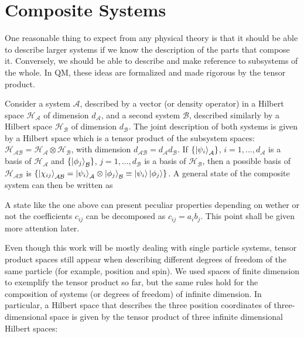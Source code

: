 \documentclass[12pt,a4paper,notitlepage]{report}
\begin{document}
\section{Composite Systems}
\label{sec:composite}

One reasonable thing to expect from any physical theory is that it should be able to describe larger systems if we know the description of the parts that compose it. Conversely, we should be able to describe and make reference to subsystems of the whole. In QM, these ideas are formalized and made rigorous by the tensor product.

Consider a system $\mathcal{A}$, described by a vector (or density operator) in a Hilbert space $\mathcal{H}_{\mathcal{A}}$ of dimension $d_\mathcal{A}$, and a second system $\mathcal{B}$, described similarly by a Hilbert space $\mathcal{H}_{\mathcal{B}}$ of dimension $d_\mathcal{B}$. The joint description of both systems is given by a Hilbert space which is a tensor product of the subsystem spaces: $\mathcal{H}_{\mathcal{AB}} = \mathcal{H}_{\mathcal{A}}\otimes\mathcal{H}_{\mathcal{B}}$, with dimension $d_{\mathcal{AB}} = d_\mathcal{A} d_\mathcal{B}$. If $\{ \ket{\psi_i}_\mathcal{A} \}$, $i = 1, ..., d_\mathcal{A}$ is a basis of $\mathcal{H}_\mathcal{A}$ and $\{\ket{\phi_j}_\mathcal{B} \}$, $j = 1, ..., d_\mathcal{B}$ is a basis of $\mathcal{H}_\mathcal{B}$, then a possible basis of $\mathcal{H}_{\mathcal{AB}}$ is $\{ \ket{\chi_{ij}}_{\mathcal{AB}} = \ket{\psi_i}_\mathcal{A}\otimes \ket{\phi_j}_\mathcal{B} \equiv \ket{\psi_i}\ket{\phi_j}\}$. A general state of the composite system can then be written as

%
A state like the one above can present peculiar properties depending on wether or not the coefficients $c_{ij}$ can be decomposed as $c_{ij} = a_ib_j$. This point shall be given more attention later.

Even though this work will be mostly dealing with single particle systems, tensor product spaces still appear when describing different degrees of freedom of the same particle (for example, position and spin). We used spaces of finite dimension to exemplify the tensor product so far, but the same rules hold for the composition of systems (or degrees of freedom) of infinite dimension. In particular, a Hilbert space that describes the three position coordinates of three-dimensional space is given by the tensor product of three infinite dimensional Hilbert spaces:
\end{document}
